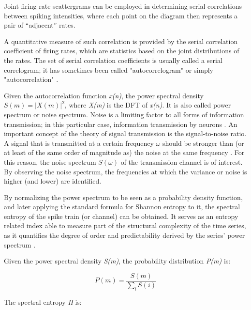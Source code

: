 \documentclass{article}
\begin{document}
Joint firing rate scattergrams can be employed in determining serial correlations between spiking intensities, where each point on the diagram then represents a pair of “adjacent” rates. 

A quantitative measure of such correlation is provided by the serial correlation coefficient of firing rates, which are statistics based on the joint distributions of the rates. 
The set of serial correlation coefficients is usually called a serial correlogram; it has sometimes been called "autocorrelogram" or simply "autocorrelation"  \citep{Perkel}. 

Given the autocorrelation function \textit{x(n)}, the power spectral density \begin{math}S(m) = |X(m)|^2\end{math}, where \textit{X(m)} is the DFT of \textit{x(n)}. 
It is also called power spectrum or noise spectrum. 
Noise is a limiting factor to all forms of information transmission; in this particular case, information transmission by neurons \citep{Gerstner}. 
An important concept of the theory of signal transmission is the signal-to-noise ratio. 
A signal that is transmitted at a certain frequency \begin{math}\omega\end{math} should be stronger than (or at least of the same order of magnitude as) the noise at the same frequency \citep{Gerstner}. 
For this reason, the noise spectrum \begin{math}S(\omega)\end{math} of the transmission channel is of interest. 
By observing the noise spectrum, the frequencies at which the variance or noise is higher (and lower) are identified.

By normalizing the power spectrum to be seen as a probability density function, and later applying the standard formula for Shannon entropy to it, the spectral entropy of the spike train (or channel) can be obtained. 
It serves as an entropy related index able to measure part of the structural complexity of the time series, as it quantifies the degree of order and predictability derived by the series' power spectrum \citep{Zacca}.

Given the power spectral density \textit{S(m)}, the probability distribution \textit{P(m)} is:

\begin{equation}
P(m) = \frac{S(m)}{\sum_i S(i)}
\end{equation}

The spectral entropy \textit{H} is:
\end{document}

